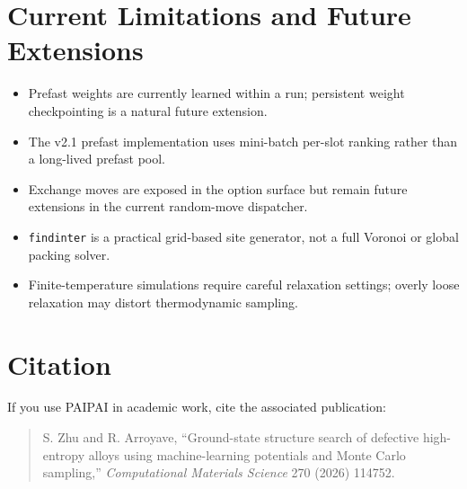 \documentclass[11pt]{article}
\newcommand{\PAIPAI}{\textsc{PAIPAI}}
\begin{document}
\section{Current Limitations and Future Extensions}

\begin{itemize}
  \item Prefast weights are currently learned within a run; persistent weight checkpointing is a natural future extension.
  \item The v2.1 prefast implementation uses mini-batch per-slot ranking rather than a long-lived prefast pool.
  \item Exchange moves are exposed in the option surface but remain future extensions in the current random-move dispatcher.
  \item \texttt{findinter} is a practical grid-based site generator, not a full Voronoi or global packing solver.
  \item Finite-temperature simulations require careful relaxation settings; overly loose relaxation may distort thermodynamic sampling.
\end{itemize}

\section{Citation}

If you use \PAIPAI{} in academic work, cite the associated publication:

\begin{quote}
S. Zhu and R. Arroyave,
``Ground-state structure search of defective high-entropy alloys using machine-learning potentials and Monte Carlo sampling,''
\emph{Computational Materials Science} 270 (2026) 114752.
\end{quote}
\end{document}
